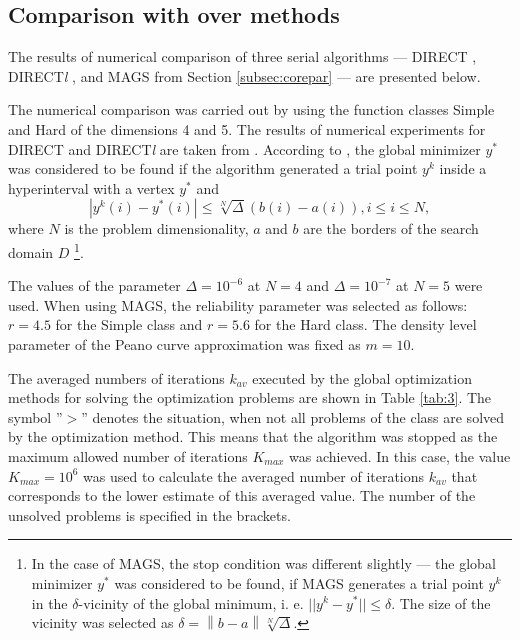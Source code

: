 \documentclass{aims}
\theoremstyle{definition}
\begin{document}
\subsection{Comparison with over methods}
The results of numerical comparison of three serial algorithms --- DIRECT
\cite{Jones}, DIRECT\textit{l} \cite{Gablonsky}, and MAGS from Section \ref{subsec:corepar} --- are presented below.

The numerical comparison was carried out by using the function classes Simple and Hard
of the dimensions 4 and 5. The results of numerical experiments for DIRECT and
DIRECT\textit{l} are taken from \cite{sergeyevKvasov2006}. According to \cite{sergeyevKvasov2006}, the global minimizer \(y^*\)
was considered to be found if the algorithm generated a trial point \(y^k\) inside
a hyperinterval with a vertex \(y^*\) and
\begin{displaymath}
    |y^k(i)-y^*(i)|\le \sqrt[N]{\Delta}(b(i)-a(i)), i\le i\le N,
\end{displaymath}
where \(N\) is the problem dimensionality, $a$ and $b$ are the borders of the search domain \(D\)
\footnote{In the case of MAGS, the stop condition was different slightly --- the
global minimizer \(y^*\) was considered to be found, if MAGS generates a trial
point \(y^k\)  in the \(\delta\)-vicinity of the global minimum, i. e. \(||y^k-y^*||\le\delta\).
The size of the vicinity was selected  as \(\delta=\left\|b-a\right\|\sqrt[N]{\Delta}\).}.

The values of the parameter \(\Delta = 10^{-6}\) at \(N = 4\) and \(\Delta = 10^{-7}\)
at \(N = 5\) were used. When using MAGS, the reliability parameter was selected as
follows: \(r = 4.5\) for the Simple class and \(r = 5.6\) for the Hard class.
The density level parameter of the Peano curve approximation was fixed as \(m = 10\).

The averaged numbers of iterations $k_{av}$ executed by the global optimization methods
for solving the optimization problems are shown in Table \ref{tab:3}. The symbol ''$>$''
denotes the situation, when not all problems of the class are solved by the optimization
method. This means that the algorithm was stopped as the maximum allowed number of
iterations $K_{max}$ was achieved. In this case, the value $K_{max}= 10^6$  was used to
calculate the averaged number of iterations $k_{av}$ that corresponds to the lower estimate
of this averaged value. The number of the unsolved problems is specified in the brackets.
\end{document}
